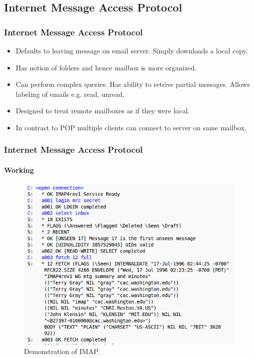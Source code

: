\documentclass{beamer}
\begin{document}
\subsection{Internet Message Access Protocol}
\begin{frame}
  \frametitle{Internet Message Access Protocol}
  \begin{itemize}
    \item Defaults to leaving message on email server. Simply downloads a local copy.
    \item Has notion of folders and hence mailbox is more organized.
    \item Can perform complex queries. Has ability to retrive partial messages. Allows labeling of emails e.g. read, unread.
    \item Designed to treat remote mailboxes as if they were local.
    \item In contrast to POP multiple clients can connect to server on same mailbox.
  \end{itemize}
  
\end{frame}
\begin{frame}
  \frametitle{Internet Message Access Protocol}
  \framesubtitle{Working}
  \begin{figure}[h]
    \includegraphics[scale = 0.35]{imap1.png}
    \caption{Demonstration of IMAP.}
    \centering
  \end{figure}
\end{frame}
\end{document}
